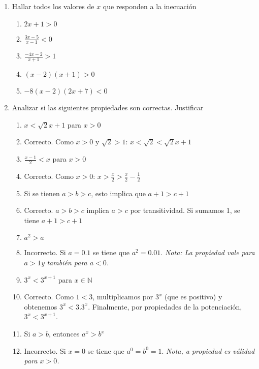 \documentclass[a4paper]{article}
\newcommand{\answer}{\item[**]}
\newcommand{\exercise}{\item}
\begin{document}
\begin{enumerate}
	\exercise Hallar todos los valores de $x$ que responden a la inecuación
	\begin{enumerate} [label=(\alph*)]
		\item $2x+1>0$

		\item $\displaystyle\frac{3x-5}{x-1}<0$

		\item $\displaystyle\frac{-4x-2}{x+1}>1$

		\item $(x-2)(x+1)>0$

		\item $-8(x-2)(2x+7)<0$
	
	\end{enumerate}


	\exercise Analizar si las siguientes propiedades son correctas. Justificar
	\begin{multicols}{2}
	\begin{enumerate} [label=(\alph*)]
		\item $x < \sqrt{2} x +1$ para $x>0$
		\answer Correcto. Como $x>0$ y $\sqrt{2}>1$: $x < \sqrt{2} < \sqrt{2} x +1$
		
		\item $\displaystyle\frac{x-1}{2} < x$ para $x>0$
		\answer Correcto. Como $x>0$: $x > \displaystyle\frac{x}{2} > \displaystyle\frac{x}{2}-\displaystyle\frac{1}{2}$ 

		\item Si se tienen $a>b>c$, esto implica que $a+1>c+1$
		\answer	Correcto. $a>b>c$ implica $a>c$ por transitividad. Si sumamos 1, se tiene $a+1>c+1$

		\item $a^2 > a$
		\answer Incorrecto. Si $a=0.1$ se tiene que $a^2=0.01$. \textit{Nota: La propiedad vale para $a>1$y también para $a<0$.}

		\item $3^{x} < 3^{x+1}$ para $x \in \mathbb{N}$
		\answer Correcto. Como $1 < 3$, multiplicamos por $3^{x}$ (que es positivo) y obtenemos $3^{x} < 3.3^{x}$. Finalmente, por propiedades de la potenciación, $3^{x} < 3^{x+1}$.

		\item Si $a>b$, entonces $a^x > b^x$
		\answer Incorrecto. Si $x=0$ se tiene que $a^0=b^0=1$. \textit{Nota, a propiedad es válidad para $x>0$.}

	\end{enumerate}
	\end{multicols}


\end{enumerate}
\end{document}

